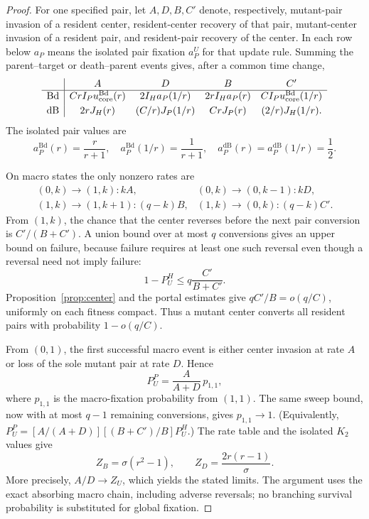\documentclass[11pt]{article}
\theoremstyle{definition}
\theoremstyle{remark}
\newcommand{\Bd}{\mathrm{Bd}}
\newcommand{\dB}{\mathrm{dB}}
\begin{document}
\begin{proof}
For one specified pair, let $A,D,B,C'$ denote, respectively, mutant-pair
invasion of a resident center, resident-center recovery of that pair,
mutant-center invasion of a resident pair, and resident-pair recovery of
the center.  In each row below $a_P$ means the isolated pair fixation
$a_P^U$ for that update rule.  Summing the parent--target or death--parent events gives,
after a common time change,
\[
\begin{array}{c|cccc}
 &A&D&B&C'\\ \hline
 \Bd&
 CrI_Pu_{\rm core}^{\Bd}(r)&
 2I_Ha_P(1/r)&
 2rI_Ha_P(r)&
 CI_Pu_{\rm core}^{\Bd}(1/r)\\[1mm]
 \dB&
 2rJ_H(r)&
 (C/r)J_P(1/r)&
 CrJ_P(r)&
 (2/r)J_H(1/r).
\end{array}
\]
The isolated pair values are
\[
 a_P^{\Bd}(r)=\frac r{r+1},\quad
 a_P^{\Bd}(1/r)=\frac1{r+1},\quad
 a_P^{\dB}(r)=a_P^{\dB}(1/r)=\frac12.
\]

On macro states the only nonzero rates are
\[
\begin{array}{ll}
 (0,k)\to(1,k):kA,&(0,k)\to(0,k-1):kD,\\
 (1,k)\to(1,k+1):(q-k)B,&(1,k)\to(0,k):(q-k)C'.
\end{array}
\]
From $(1,k)$, the chance that the center reverses before the next pair
conversion is $C'/(B+C')$.  A union bound over at most $q$ conversions gives
an upper bound on failure, because failure requires at least one such
reversal even though a reversal need not imply failure:
\[
 1-P_U^H\le q\frac{C'}{B+C'}.
\]
Proposition~\ref{prop:center} and the portal estimates give
$qC'/B=o(q/C)$, uniformly on each fitness compact.  Thus a mutant center
converts all resident pairs with probability $1-o(q/C)$.

From $(0,1)$, the first successful macro event is either center invasion at
rate $A$ or loss of the sole mutant pair at rate $D$.  Hence
\[
 P_U^P=\frac{A}{A+D}\,p_{1,1},
\]
where $p_{1,1}$ is the macro-fixation probability from $(1,1)$.  The same
sweep bound, now with at most $q-1$ remaining conversions, gives
$p_{1,1}\to1$.  (Equivalently,
$P_U^P=[A/(A+D)][(B+C')/B]P_U^H$.)
The rate table and the isolated $K_2$ values give
\[
 Z_B=\sigma(r^2-1),\qquad
 Z_D=\frac{2r(r-1)}{\sigma}.
\]
More precisely, $A/D\to Z_U$, which yields the stated limits.  The argument
uses the exact absorbing macro chain, including adverse reversals; no
branching survival probability is substituted for global fixation.
\end{proof}
\end{document}
